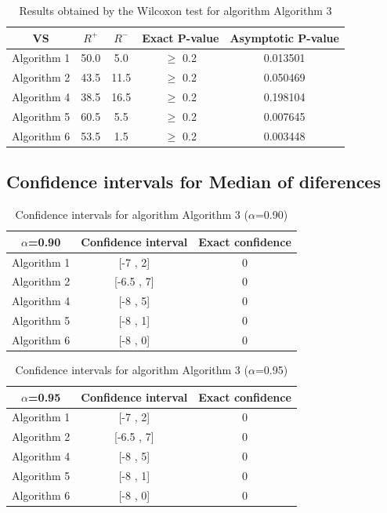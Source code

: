 \documentclass[a4paper,10pt]{article}
\begin{document}
\begin{table}[!htp]
\centering\small
\begin{tabular}{
|c|c|c|c|c|}
\hline
 VS & $R^{+}$ & $R^{-}$ & Exact P-value & Asymptotic P-value \\ \hline 
Algorithm 1 & 50.0 & 5.0 & $\geq$ 0.2 & 0.013501\\ \hline 
Algorithm 2 & 43.5 & 11.5 & $\geq$ 0.2 & 0.050469\\ \hline 
Algorithm 4 & 38.5 & 16.5 & $\geq$ 0.2 & 0.198104\\ \hline 
Algorithm 5 & 60.5 & 5.5 & $\geq$ 0.2 & 0.007645\\ \hline 
Algorithm 6 & 53.5 & 1.5 & $\geq$ 0.2 & 0.003448\\ \hline 

\end{tabular}
\caption{Results obtained by the Wilcoxon test for algorithm Algorithm 3}
\end{table}

\subsection{Confidence intervals for Median of diferences}

\begin{table}[!htp]
\centering\small
\begin{tabular}{
|c|c|c|}
\hline
 $\alpha$=0.90 & Confidence interval & Exact confidence \\ \hline 
Algorithm 1 & [-7 , 2] & 0\\ \hline 
Algorithm 2 & [-6.5 , 7] & 0\\ \hline 
Algorithm 4 & [-8 , 5] & 0\\ \hline 
Algorithm 5 & [-8 , 1] & 0\\ \hline 
Algorithm 6 & [-8 , 0] & 0\\ \hline 

\end{tabular}
\caption{Confidence intervals for algorithm Algorithm 3 ($\alpha$=0.90)}
\end{table}
\begin{table}[!htp]
\centering\small
\begin{tabular}{
|c|c|c|}
\hline
 $\alpha$=0.95 & Confidence interval & Exact confidence \\ \hline 
Algorithm 1 & [-7 , 2] & 0\\ \hline 
Algorithm 2 & [-6.5 , 7] & 0\\ \hline 
Algorithm 4 & [-8 , 5] & 0\\ \hline 
Algorithm 5 & [-8 , 1] & 0\\ \hline 
Algorithm 6 & [-8 , 0] & 0\\ \hline 

\end{tabular}
\caption{Confidence intervals for algorithm Algorithm 3 ($\alpha$=0.95)}
\end{table}
\end{document}
